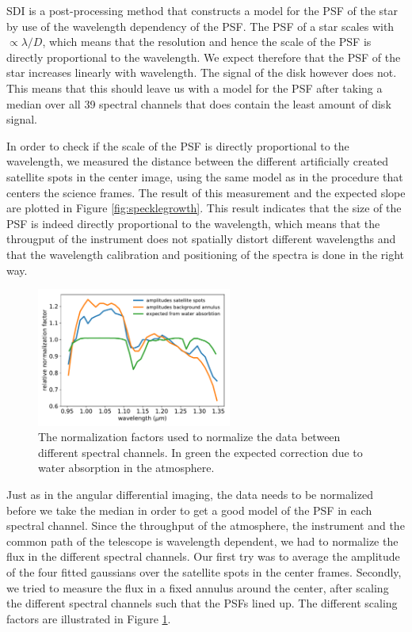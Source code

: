 \documentclass[twoside,single]{lion-msc}
\begin{document}
SDI is a post-processing method that constructs a model for the PSF of the star by use of the wavelength dependency of the PSF. The PSF of a star scales with $ \propto\lambda/D$, which means that the resolution and hence the scale of the PSF is directly proportional to the wavelength. We expect therefore that the PSF of the star increases linearly with wavelength. The signal of the disk however does not. This means that this should leave us with a model for the PSF after taking a median over all 39 spectral channels that does contain the least amount of disk signal.
\bigskip

In order to check if the scale of the PSF is directly proportional to the wavelength, we measured the distance between the different artificially created satellite spots in the center image, using the same model as in the procedure that centers the science frames. The result of this measurement and the expected slope are plotted in Figure \ref{fig:specklegrowth}. This result indicates that the size of the PSF is indeed directly proportional to the wavelength, which means that the througput of the instrument does not spatially distort different wavelengths and that the wavelength calibration and positioning of the spectra is done in the right way.
\bigskip

\begin{figure}
\centering
\includegraphics[width = 0.57\textwidth]{allnormalization}
\caption{The normalization factors used to normalize the data between different spectral channels. In green the expected correction due to water absorption in the atmosphere.}
\label{fig:throughputnorm}
\vspace{-5mm}
\end{figure}

\noindent
Just as in the angular differential imaging, the data needs to be normalized before we take the median in order to get a good model of the PSF in each spectral channel. Since the throughput of the atmosphere, the instrument and the common path of the telescope is wavelength dependent, we had to normalize the flux in the different spectral channels. Our first try was to average the amplitude of the four fitted gaussians over the satellite spots in the center frames. Secondly, we tried to measure the flux in a fixed annulus around the center, after scaling the different spectral channels such that the PSFs lined up. The different scaling factors are illustrated in Figure \ref{fig:throughputnorm}.
\bigskip
\end{document}
